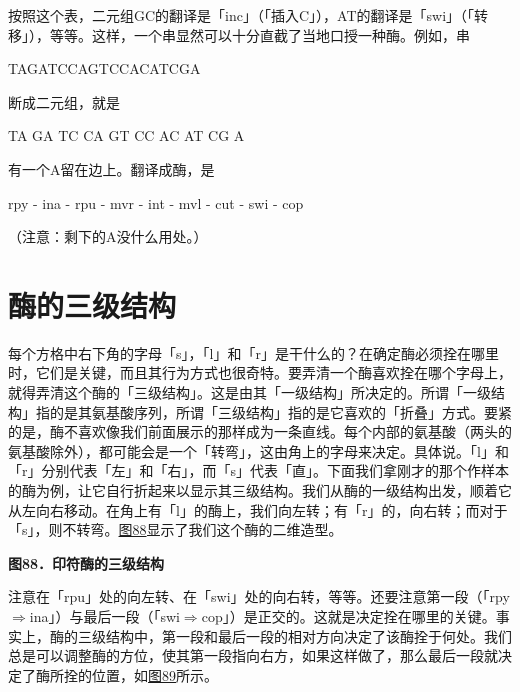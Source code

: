 \documentclass[
  12pt,
  twoside,
  openright,
  oldfontcommands,
]{memoir}
\begin{document}
按照这个表，二元组GC的翻译是「inc」（「插入C」），AT的翻译是「swi」（「转移」），等等。这样，一个串显然可以十分直截了当地口授一种酶。例如，串

TAGATCCAGTCCACATCGA

断成二元组，就是

TA GA TC CA GT CC AC AT CG A

有一个A留在边上。翻译成酶，是

rpy - ina - rpu - mvr - int - mvl - cut - swi - cop

（注意：剩下的A没什么用处。）

\section{酶的三级结构}

每个方格中右下角的字母「s」，「l」和「r」是干什么的？在确定酶必须拴在哪里时，它们是关键，而且其行为方式也很奇特。要弄清一个酶喜欢拴在哪个字母上，就得弄清这个酶的「三级结构」。这是由其「一级结构」所决定的。所谓「一级结构」指的是其氨基酸序列，所谓「三级结构」指的是它喜欢的「折叠」方式。要紧的是，酶不喜欢像我们前面展示的那样成为一条直线。每个内部的氨基酸（两头的氨基酸除外），都可能会是一个「转弯」，这由角上的字母来决定。具体说。「l」和「r」分别代表「左」和「右」，而「s」代表「直」。下面我们拿刚才的那个作样本的酶为例，让它自行折起来以显示其三级结构。我们从酶的一级结构出发，顺着它从左向右移动。在角上有「l」的酶上，我们向左转；有「r」的，向右转；而对于「s」，则不转弯。\hyperref[fig:88]{图88}显示了我们这个酶的二维造型。


\label{fig:88}
\begin{center}\small\textbf{图88．印符酶的三级结构}\end{center}

注意在「rpu」处的向左转、在「swi」处的向右转，等等。还要注意第一段（「rpy$\Rightarrow$ina」）与最后一段（「swi$\Rightarrow$cop」）是正交的。这就是决定拴在哪里的关键。事实上，酶的三级结构中，第一段和最后一段的相对方向决定了该酶拴于何处。我们总是可以调整酶的方位，使其第一段指向右方，如果这样做了，那么最后一段就决定了酶所拴的位置，如\hyperref[fig:89]{图89}所示。
\end{document}
